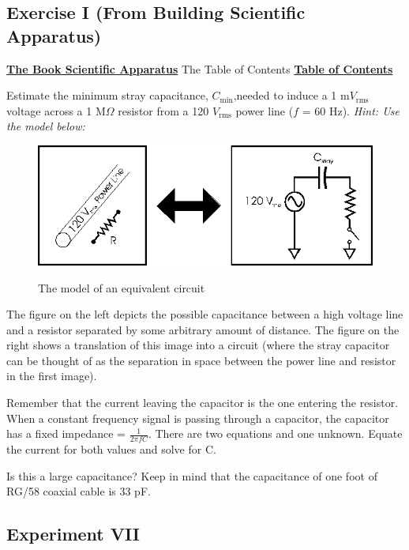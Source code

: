 \documentclass{../lab}
\begin{document}
\subsection{Exercise I (From Building Scientific Apparatus)}

\href{http://physics111.lib.berkeley.edu/Physics111/Reprints/Apparatus\%20Book/Building-Scientific-Apparatus--Moore.pdf}{\textbf{The Book Scientific Apparatus}} The Table of Contents \href{http://physics111.lib.berkeley.edu/Physics111/Reprints/Apparatus\%20Book/toc.pdf}{\textbf{Table of Contents}}

Estimate the minimum stray capacitance, $C_\text{min}$,needed to induce a 1 m$V_\text{rms}$ voltage across a 1 M$\Omega$ resistor from a 120 $V_\text{rms}$ power line ($f$ = 60 Hz). \emph{Hint: Use the model below:}

\begin{figure}[h]
    \centering
    \href{http://experimentationlab.berkeley.edu/sites/default/files/images/LLSimage022.gif}{\includegraphics[width=0.5\linewidth]{images/LLSimage022.png}}
    \caption{The model of an equivalent circuit}
    \label{fig:LLSimage022}
\end{figure}

The figure on the left depicts the possible capacitance between a high voltage line and a resistor separated by some arbitrary amount of distance. The figure on the right shows a translation of this image into a circuit (where the stray capacitor can be thought of as the separation in space between the power line and resistor in the first image).

Remember that the current leaving the capacitor is the one entering the resistor. When a constant frequency signal is passing through a capacitor, the capacitor has a fixed impedance = $\frac{1}{2 \pi f C}$. There are two equations and one unknown. Equate the current for both values and solve for C.

Is this a large capacitance? Keep in mind that the capacitance of one foot of RG/58 coaxial cable is 33 pF.

\subsection{Experiment VII}
\end{document}
